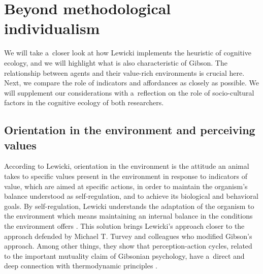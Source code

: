\documentclass[%
manuscript=article,
year=2024,
volume=77,
doi=00000.000,
]{zfn}
\begin{document}
\section{Beyond methodological individualism}

We will take a~closer look at how Lewicki implements the heuristic of cognitive ecology, and we will highlight what is also characteristic of Gibson. The relationship between agents and their value-rich environments is crucial here. Next, we compare the role of indicators and affordances as closely as possible. We will supplement our considerations with a~reflection on the role of socio-cultural factors in the cognitive ecology of both researchers.



\subsection{Orientation in the environment and perceiving values}



According to Lewicki, orientation in the environment is the attitude an animal takes to specific values present in the environment in response to indicators of value, which are aimed at specific actions, in order to maintain the organism's balance understood as self-regulation, and to achieve its biological and behavioral goals. By self-regulation, Lewicki understands the adaptation of the organism to the environment which means maintaining an internal balance in the conditions the environment offers 
\parencite[][p.182]{lewicki_procesy_1960}. %
 This solution brings Lewicki's approach closer to the approach defended by Michael T. Turvey and colleagues who modified Gibson's approach. Among other things, they show that perception-action cycles, related to the important mutuality claim of Gibsonian psychology, have a~direct and deep connection with thermodynamic principles 
\parencite[e.g.,][]{swenson_thermodynamic_1991}.%
\end{document}
